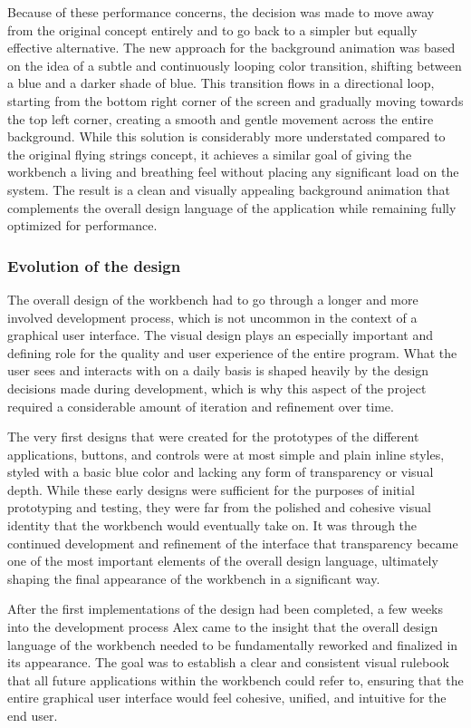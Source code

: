 \documentclass[a4paper,12pt]{article}
\begin{document}
Because of these performance concerns, the decision was made to move away from the original concept entirely and to go back to a simpler but equally effective alternative. The new approach for the background animation was based on the idea of a subtle and continuously looping color transition, shifting between a blue and a darker shade of blue. This transition flows in a directional loop, starting from the bottom right corner of the screen and gradually moving towards the top left corner, creating a smooth and gentle movement across the entire background. While this solution is considerably more understated compared to the original flying strings concept, it achieves a similar goal of giving the workbench a living and breathing feel without placing any significant load on the system. The result is a clean and visually appealing background animation that complements the overall design language of the application while remaining fully optimized for performance.

\newpage
\subsubsection{Evolution of the design}
The overall design of the workbench had to go through a longer and more involved development process, which is not uncommon in the context of a graphical user interface.
The visual design plays an especially important and defining role for the quality and user experience of the entire program. 
What the user sees and interacts with on a daily basis is shaped heavily by the design decisions made during development, which is why this aspect of the project required a considerable amount of iteration and refinement over time.

The very first designs that were created for the prototypes of the different applications, buttons, and controls were at most simple and plain inline styles, styled with a basic blue color and lacking any form of transparency or visual depth. 
While these early designs were sufficient for the purposes of initial prototyping and testing, they were far from the polished and cohesive visual identity that the workbench would eventually take on. 
It was through the continued development and refinement of the interface that transparency became one of the most important elements of the overall design language, ultimately shaping the final appearance of the workbench in a significant way.

After the first implementations of the design had been completed, a few weeks into the development process Alex came to the insight that the overall design language of the workbench needed to be fundamentally reworked and finalized in its appearance. 
The goal was to establish a clear and consistent visual rulebook that all future applications within the workbench could refer to, ensuring that the entire graphical user interface would feel cohesive, unified, and intuitive for the end user.
\end{document}
